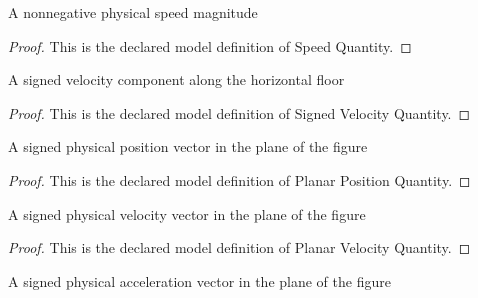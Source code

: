 \begin{definition}
  \label{def:physics:phyx-mini-0768:phyxminiproblems-problemphyxmini0768-speedquantity}
  A nonnegative physical speed magnitude
\end{definition}
\begin{proof}
  This is the declared model definition of Speed Quantity.
\end{proof}
\begin{definition}
  \label{def:physics:phyx-mini-0768:phyxminiproblems-problemphyxmini0768-signedvelocityquantity}
  A signed velocity component along the horizontal floor
\end{definition}
\begin{proof}
  This is the declared model definition of Signed Velocity Quantity.
\end{proof}
\begin{definition}
  \label{def:physics:phyx-mini-0768:phyxminiproblems-problemphyxmini0768-planarpositionquantity}
  A signed physical position vector in the plane of the figure
\end{definition}
\begin{proof}
  This is the declared model definition of Planar Position Quantity.
\end{proof}
\begin{definition}
  \label{def:physics:phyx-mini-0768:phyxminiproblems-problemphyxmini0768-planarvelocityquantity}
  A signed physical velocity vector in the plane of the figure
\end{definition}
\begin{proof}
  This is the declared model definition of Planar Velocity Quantity.
\end{proof}
\begin{definition}
  \label{def:physics:phyx-mini-0768:phyxminiproblems-problemphyxmini0768-planaraccelerationquantity}
  A signed physical acceleration vector in the plane of the figure
\end{definition}
